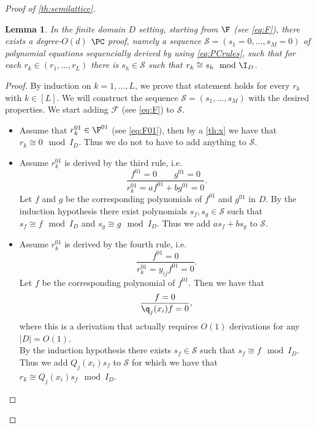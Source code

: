 \documentclass[11pt]{article}
\newtheorem{lemma}[theorem]{Lemma}
\begin{document}
\begin{proof} [Proof of \cref{th:semilattice}]
\begin{lemma}\label{th:PC_proof_semilattice}
        In the finite domain $D$ setting, starting from $\F$ (see \cref{eq:F}), there exists a degree-$O(d)$ $\PC$ proof, namely a sequence $\mathcal{S} = (s_1=0,\ldots,s_M=0)$ of polynomial equations sequencially derived by using \eqref{eq:PCrules}, such that for each $r_k\in (r_1,\ldots,r_L)$ there is $s_h\in \mathcal{S}$ such that $r_k \cong s_h \mod{\I_D}$.
    \end{lemma}
    
    \begin{proof}
        By induction on $k=1,\ldots,L$, we prove that statement holds for every $r_k$ with $k\in[L]$. We will construct the sequence $\mathcal{S} = (s_1, \dots, s_M)$ with the desired properties. We start adding $\mathcal{F}$ (see \cref{eq:F}) to $\mathcal{S}$.\\
        \begin{itemize}
            \item Assume that $r^{01}_k\in \F^{01}$ (see \cref{eq:F01}), then by a \cref{th:x} we have that $r_k \cong 0 \mod{I_D}$. Thus we do not to have to add anything to $\mathcal{S}$.
            \item Assume $r_k^{01}$ is derived by the third rule, i.e.
                \begin{equation}
                    \frac{f^{01}=0 \qquad g^{01}=0}{r_k^{01}=a f^{01} + b g^{01} =0}. 
                \end{equation}
                Let $f$ and $g$ be the corresponding polynomials of $f^ {01}$ and $g^{01}$ in $D$. By the induction hypothesis there exist polynomials $s_f, s_g \in \mathcal{S}$ such that $s_f \cong f \mod{I_D}$ and $s_g \cong g \mod{I_D}$. Thus we add $a s_f + b s_g$ to $\mathcal{S}$.
            \item Assume $r_k^{01}$ is derived by the fourth rule, i.e.
                \begin{equation*}%
                    \frac{f^{01}=0}{r_k^{01}=y_{ij}f^{01}=0}. 
                \end{equation*}
                Let $f$ be the corresponding polynomial of $f^{01}$. Then we have that 
                \begin{equation*}%
                    \frac{f=0}{\q_j(x_i)f=0},
                \end{equation*}
                where this is a derivation that actually requires $O(1)$ derivations for any $|D| = O(1)$.\\
                By the induction hypothesis there exists $s_f \in \mathcal{S}$ such that $s_f \cong f \mod{I_D}$. Thus we add $Q_j(x_i)s_f$ to $\mathcal{S}$ for which we have that $r_k \cong Q_j(x_i)s_f \mod{I_D}$.
            \end{itemize}
    \end{proof}
    

\end{proof}
\end{document}
